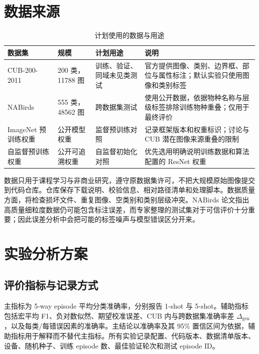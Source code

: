 \documentclass[UTF8,zihao=-4,scheme=chinese]{ctexart}
\begin{document}
\section{数据来源}

\begin{table}[htbp]
  \centering
  \caption{计划使用的数据与用途}
  \label{tab:data}
  \small
  \begin{tabularx}{\textwidth}{p{2.4cm}p{2.2cm}p{2.3cm}X}
    \toprule
    数据集 & 规模 & 计划用途 & 说明 \\
    \midrule
    CUB-200-2011 & 200 类，11788 图 & 训练、验证、同域未见类测试 & 官方提供图像、类别、边界框、部位与属性标注；默认实验只使用图像和类别标签\cite{wah2011cub} \\
    NABirds & 555 类，48562 图 & 跨数据集测试 & 使用公开数据，依据物种名称与层级标签排除训练物种重叠；仅用于最终评价\cite{vanhorn2015nabirds} \\
    ImageNet 预训练权重 & 公开模型权重 & 监督预训练对照 & 记录框架版本和权重标识；讨论与 CUB 潜在图像来源重叠的限制 \\
    自监督预训练权重 & 公开可追溯权重 & 自监督初始化对照 & 优先选用明确说明训练数据和算法配置的 ResNet 权重 \\
    \bottomrule
  \end{tabularx}
\end{table}

数据只用于课程学习与非商业研究，遵守原数据集许可，不把大规模原始图像提交到代码仓库。仓库保存下载说明、校验信息、相对路径清单和处理脚本。数据质量方面，将检查损坏文件、重复图像、空类别和类别层级冲突。NABirds 论文指出高质量细粒度数据仍可能包含标注误差，而专家整理的测试集对于可信评价十分重要\cite{vanhorn2015nabirds}；因此误差分析中会把可能的标签噪声与模型错误区分开来。

\section{实验分析方案}

\subsection{评价指标与记录方式}

主指标为 5-way episode 平均分类准确率，分别报告 1-shot 与 5-shot。辅助指标包括宏平均 F1、负对数似然、期望校准误差、CUB 内与跨数据集准确率差 $\Delta_{\mathrm{gen}}$，以及每类/每错误因素的准确率。主结论以准确率及其 95\% 置信区间为依据，辅助指标用于解释而不替代主指标。所有实验记录配置、代码版本、数据清单版本、设备、随机种子、训练 episode 数、最佳验证轮次和测试 episode ID。
\end{document}
